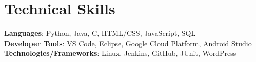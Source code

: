 \documentclass[letterpaper,11pt]{article}
\begin{document}
%
\section{Technical Skills}
 \begin{itemize}[leftmargin=0.15in, label={}]
    \small{\item{
     \textbf{Languages}{: Python, Java, C, HTML/CSS, JavaScript, SQL} \\
     \textbf{Developer Tools}{: VS Code, Eclipse, Google Cloud Platform, Android Studio} \\
     \textbf{Technologies/Frameworks}{: Linux, Jenkins, GitHub, JUnit, WordPress} \\
    }}
 \end{itemize}
 \vspace{-16pt}
\end{document}
